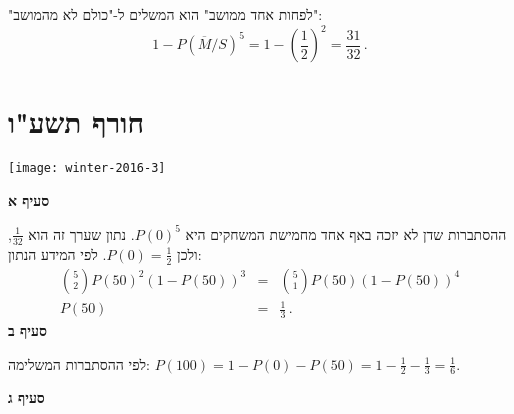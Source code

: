 "לפחות אחד ממושב" הוא המשלים ל-"כולם לא מהמושב":
\[
1-P(\overline{M}/S)^5=1-\left(\frac{1}{2}\right)^2=\frac{31}{32}\,.
\]

\np
\section{חורף תשע"ו}

\begin{center}
\texttt{[image: winter-2016-3]}
\end{center}
\textbf{סעיף א}

ההסתברות שדן לא יזכה באף אחד מחמישת המשחקים היא 
$P(0)^5$.
נתון שערך זה הוא 
$\frac{1}{32}$,
ולכן 
$P(0)=\frac{1}{2}$.
לפי המידע הנתון:
\begin{eqnarray*}
{5\choose 2} P(50)^2 (1-P(50))^3 &=& {5\choose 1} P(50) (1-P(50))^4\\
P(50)&=&\frac{1}{3}\,.
\end{eqnarray*}
\textbf{סעיף ב}

לפי ההסתברות המשלימה:
$\displaystyle P(100) = 1 - P(0) - P(50) = 1-\frac{1}{2}-\frac{1}{3}=\frac{1}{6}$.

\textbf{סעיף ג}

